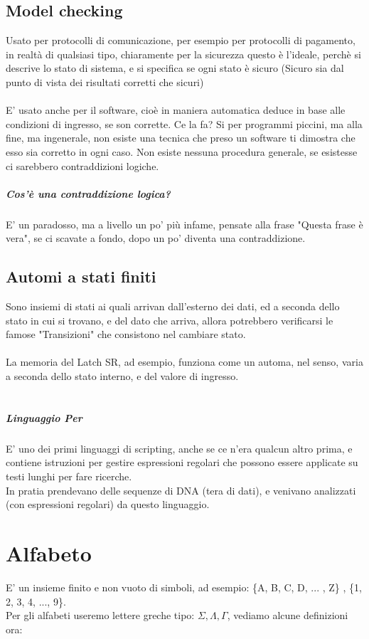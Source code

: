 \documentclass[12pt, a4paper, openany, oneside]{book}
\begin{document}
\section{Model checking}
Usato per protocolli di comunicazione, per esempio per protocolli di pagamento,
in realtà di qualsiasi tipo, chiaramente per la sicurezza questo è l'ideale, 
perchè si descrive lo stato di sistema, e si specifica se ogni stato è sicuro
(Sicuro sia dal punto di vista dei risultati corretti che sicuri)
\\ \\
E' usato anche per il software, cioè in maniera automatica deduce in base alle
condizioni di ingresso, se son corrette. Ce la fa? Si per programmi piccini, 
ma alla fine, ma ingenerale, non esiste una tecnica che preso un software ti 
dimostra che esso sia corretto in ogni caso. Non esiste nessuna procedura generale,
se esistesse ci sarebbero contraddizioni logiche.
\paragraph{Cos'è una contraddizione logica?} 
E' un paradosso, ma a livello un po' più infame, pensate alla frase "Questa 
frase è vera", se ci scavate a fondo, dopo un po' diventa una contraddizione.
\section{Automi a stati finiti}
Sono insiemi di stati ai quali arrivan dall'esterno dei dati, ed a seconda dello
stato in cui si trovano, e del dato che arriva, allora potrebbero verificarsi le
famose "Transizioni" che consistono nel cambiare stato.
\\ \\ 
La memoria del Latch SR, ad esempio, funziona come un automa, nel senso, varia
a seconda dello stato interno, e del valore di ingresso.
\\ \\
\paragraph{Linguaggio Per} E' uno dei primi linguaggi di scripting, anche se ce 
n'era qualcun altro prima, e contiene istruzioni per gestire espressioni regolari
che possono essere applicate su testi lunghi per fare ricerche.\\ 
In pratia prendevano delle sequenze di DNA (tera di dati), e venivano analizzati
(con espressioni regolari) da questo linguaggio.
\chapter{Alfabeto}
E' un insieme finito e non vuoto di simboli, ad esempio:
\{A, B, C, D, ... , Z\} , \{1, 2, 3, 4, ..., 9\}. \\ 
Per gli alfabeti useremo lettere greche tipo: $\Sigma, \Lambda, \Gamma$, vediamo
alcune definizioni ora:
\end{document}
